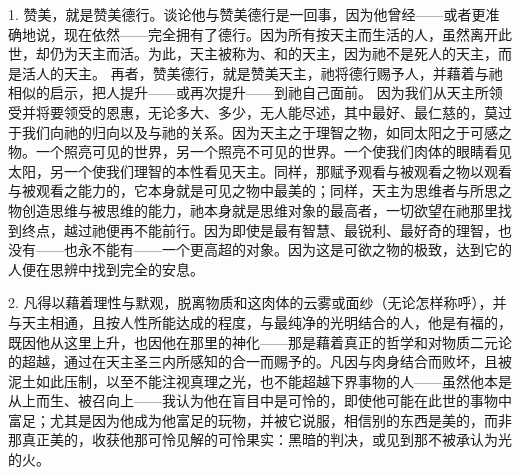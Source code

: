 \par

\par

1. 赞美，就是赞美德行。谈论他与赞美德行是一回事，因为他曾经——或者更准确地说，现在依然——完全拥有了德行。因为所有按天主而生活的人，虽然离开此世，却仍为天主而活。为此，天主被称为、和的天主，因为祂不是死人的天主，而是活人的天主。 再者，赞美德行，就是赞美天主，祂将德行赐予人，并藉着与祂相似的启示，把人提升——或再次提升——到祂自己面前。 因为我们从天主所领受并将要领受的恩惠，无论多大、多少，无人能尽述，其中最好、最仁慈的，莫过于我们向祂的归向以及与祂的关系。因为天主之于理智之物，如同太阳之于可感之物。一个照亮可见的世界，另一个照亮不可见的世界。一个使我们肉体的眼睛看见太阳，另一个使我们理智的本性看见天主。同样，那赋予观看与被观看之物以观看与被观看之能力的，它本身就是可见之物中最美的；同样，天主为思维者与所思之物创造思维与被思维的能力，祂本身就是思维对象的最高者，一切欲望在祂那里找到终点，越过祂便再不能前行。因为即使是最有智慧、最锐利、最好奇的理智，也没有——也永不能有——一个更高超的对象。因为这是可欲之物的极致，达到它的人便在思辨中找到完全的安息。\par

2. 凡得以藉着理性与默观，脱离物质和这肉体的云雾或面纱（无论怎样称呼），并与天主相通，且按人性所能达成的程度，与最纯净的光明结合的人，他是有福的，既因他从这里上升，也因他在那里的神化——那是藉着真正的哲学和对物质二元论的超越，通过在天主圣三内所感知的合一而赐予的。凡因与肉身结合而败坏，且被泥土如此压制，以至不能注视真理之光，也不能超越下界事物的人——虽然他本是从上而生、被召向上——我认为他在盲目中是可怜的，即使他可能在此世的事物中富足；尤其是因为他成为他富足的玩物，并被它说服，相信别的东西是美的，而非那真正美的，收获他那可怜见解的可怜果实：黑暗的判决，或见到那不被承认为光的火。\par

